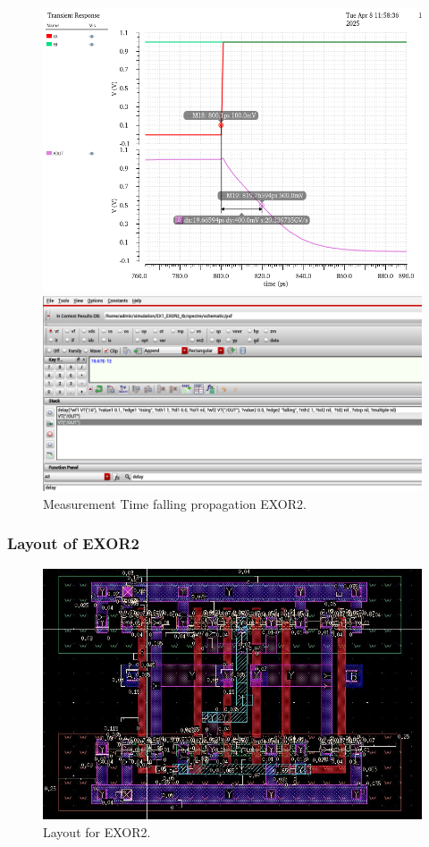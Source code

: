 \begin{figure}[H]
	\begin{minipage}{0.5\linewidth}
		\includegraphics[width=\linewidth]{section/EX1/EXOR/EX1_EXOR2_Tpdf_Waveform.png}
	\end{minipage}
	\begin{minipage}{0.5\linewidth}
		\includegraphics[width=\linewidth]{section/EX1/EXOR/EX1_EXOR2_Tpdf_Cal.png}
	\end{minipage}
	\caption{Measurement Time falling propagation EXOR2.}
\end{figure}

\subsubsection{Layout of EXOR2}

\begin{figure}[H]
	\centering
	\includegraphics[width=.7\linewidth]{section/EX1/EXOR/EX1_EXOR2_layout.png}
	\caption{Layout for EXOR2.}
	\label{f_EX1_EXOR_layout}
\end{figure}

